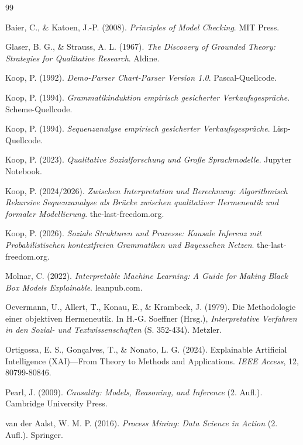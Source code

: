 \documentclass[12pt,a4paper]{article}
\begin{document}
\newpage
\begin{thebibliography}{99}

Baier, C., \& Katoen, J.-P. (2008). \textit{Principles of Model Checking}. 
MIT Press.

Glaser, B. G., \& Strauss, A. L. (1967). \textit{The Discovery of Grounded 
Theory: Strategies for Qualitative Research}. Aldine.

Koop, P. (1992). \textit{Demo-Parser Chart-Parser Version 1.0}. Pascal-Quellcode.

Koop, P. (1994). \textit{Grammatikinduktion empirisch gesicherter 
Verkaufsgespräche}. Scheme-Quellcode.

Koop, P. (1994). \textit{Sequenzanalyse empirisch gesicherter 
Verkaufsgespräche}. Lisp-Quellcode.

Koop, P. (2023). \textit{Qualitative Sozialforschung und Große Sprachmodelle}. 
Jupyter Notebook.

Koop, P. (2024/2026). \textit{Zwischen Interpretation und Berechnung: 
Algorithmisch Rekursive Sequenzanalyse als Brücke zwischen qualitativer 
Hermeneutik und formaler Modellierung}. the-last-freedom.org.

Koop, P. (2026). \textit{Soziale Strukturen und Prozesse: Kausale Inferenz 
mit Probabilistischen kontextfreien Grammatiken und Bayesschen Netzen}. 
the-last-freedom.org.

Molnar, C. (2022). \textit{Interpretable Machine Learning: A Guide for 
Making Black Box Models Explainable}. leanpub.com.

Oevermann, U., Allert, T., Konau, E., \& Krambeck, J. (1979). Die Methodologie 
einer objektiven Hermeneutik. In H.-G. Soeffner (Hrsg.), \textit{Interpretative 
Verfahren in den Sozial- und Textwissenschaften} (S. 352-434). Metzler.

Ortigossa, E. S., Gonçalves, T., \& Nonato, L. G. (2024). Explainable 
Artificial Intelligence (XAI)—From Theory to Methods and Applications. 
\textit{IEEE Access}, 12, 80799-80846.

Pearl, J. (2009). \textit{Causality: Models, Reasoning, and Inference} 
(2. Aufl.). Cambridge University Press.

van der Aalst, W. M. P. (2016). \textit{Process Mining: Data Science in 
Action} (2. Aufl.). Springer.

\end{thebibliography}
\end{document}
